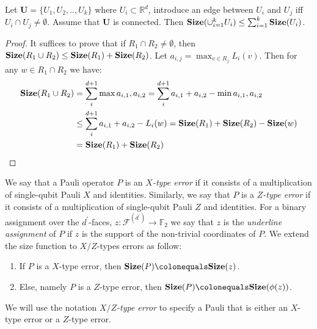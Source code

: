   \begin{claim}
    Let $\mathbf{U} = \{ U_{1}, U_{2} , .. , U_{k} \}$ where $U_{i} \subset \mathbb{R}^{d}$, introduce an edge between $U_{i}$ and $U_{j}$ iff $U_{i} \cap U_{j} \neq \emptyset$. Assume that $\mathbf{U}$ is connected. Then $\mathbf{Size}(\cup^{k}_{i=1} U_{i}) \le \sum^{k}_{i=1}{\mathbf{Size}(U_{i})}$. 
  \end{claim}
  \begin{proof}
    It suffices to prove that if $R_{1} \cap R_{2} \neq \emptyset$, then $\mathbf{Size}(R_{1} \cup R_{2}) \le \mathbf{Size}(R_{1}) + \mathbf{Size}(R_{2})$. Let $a_{i,j} = \max_{v \in R_{j}}L_{i}(v)$. Then for any $w \in R_{1}\cap R_{2}$ we have:  
    \begin{equation*}
      \begin{split}
        \mathbf{Size}(R_{1} \cup R_{2}) &= \sum_{i}^{d+1}{\max{ a_{i,1},a_{i,2} } } =  \sum_{i}^{d+1}{a_{i,1} + a_{i,2} - \min{ a_{i,1},a_{i,2} } } \\
        & \le   \sum_{i}^{d+1}{a_{i,1} + a_{i,2} - L_{i}(w) } = \mathbf{Size}(R_{1}) + \mathbf{Size}(R_{2}) - \mathbf{Size}(w)  \\
        &  = \mathbf{Size}(R_{1}) + \mathbf{Size}(R_{2}) 
      \end{split}
    \end{equation*}
  \end{proof}

\begin{definition}
  We say that a Pauli operator $P$ is an \textit{$X$-type error} if it consists of a multiplication of single-qubit Pauli $X$ and identities. Similarly, we say that $P$ is a \textit{$Z$-type error} if it consists of a multiplication of single-qubit Pauli $Z$ and identities. For a binary assignment over the $d^{\prime}$-faces, $z : \mathcal{F}^{(d^{\prime})} \rightarrow \mathbb{F}_{2}$ we say that $z$ is the \textit{underline assignment} of $P$ if $z$ is the support of the non-trivial coordinates of $P$. We extend the size function to $X/Z$-types errors as follow: 
  \begin{enumerate}
    \item If $P$ is a $X$-type error, then $\Size{P} \colonequals \Size{z}$. 
    \item Else, namely $P$ is a $Z$-type error, then $\Size{P} \colonequals \Size{\phi(z)}$. 
  \end{enumerate}
We will use the notation \textit{$X/Z$-type error} to specify a Pauli that is either an $X$-type error or a $Z$-type error.
\end{definition}


